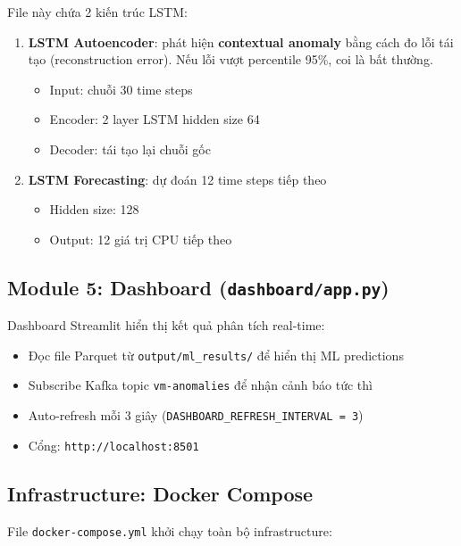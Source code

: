 \documentclass[12pt,a4paper]{article}
\begin{document}
File này chứa 2 kiến trúc LSTM:
\begin{enumerate}
  \item \textbf{LSTM Autoencoder}: phát hiện \textbf{contextual anomaly} bằng cách đo lỗi tái tạo (reconstruction error). Nếu lỗi vượt percentile 95\%, coi là bất thường.
  \begin{itemize}
    \item Input: chuỗi 30 time steps
    \item Encoder: 2 layer LSTM hidden size 64
    \item Decoder: tái tạo lại chuỗi gốc
  \end{itemize}

  \item \textbf{LSTM Forecasting}: dự đoán 12 time steps tiếp theo
  \begin{itemize}
    \item Hidden size: 128
    \item Output: 12 giá trị CPU tiếp theo
  \end{itemize}
\end{enumerate}

\subsection{Module 5: Dashboard (\texttt{dashboard/app.py})}

Dashboard Streamlit hiển thị kết quả phân tích real-time:
\begin{itemize}
  \item Đọc file Parquet từ \texttt{output/ml\_results/} để hiển thị ML predictions
  \item Subscribe Kafka topic \texttt{vm-anomalies} để nhận cảnh báo tức thì
  \item Auto-refresh mỗi 3 giây (\texttt{DASHBOARD\_REFRESH\_INTERVAL = 3})
  \item Cổng: \texttt{http://localhost:8501}
\end{itemize}

\subsection{Infrastructure: Docker Compose}

File \texttt{docker-compose.yml} khởi chạy toàn bộ infrastructure:
\end{document}
